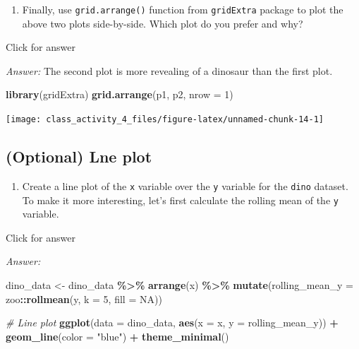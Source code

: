 \documentclass[
]{book}
\newenvironment{Shaded}{\begin{snugshade}}{\end{snugshade}}
\newcommand{\AttributeTok}[1]{\textcolor[rgb]{0.13,0.29,0.53}{#1}}
\newcommand{\CommentTok}[1]{\textcolor[rgb]{0.56,0.35,0.01}{\textit{#1}}}
\newcommand{\ConstantTok}[1]{\textcolor[rgb]{0.56,0.35,0.01}{#1}}
\newcommand{\DecValTok}[1]{\textcolor[rgb]{0.00,0.00,0.81}{#1}}
\newcommand{\FunctionTok}[1]{\textcolor[rgb]{0.13,0.29,0.53}{\textbf{#1}}}
\newcommand{\NormalTok}[1]{#1}
\newcommand{\OtherTok}[1]{\textcolor[rgb]{0.56,0.35,0.01}{#1}}
\newcommand{\SpecialCharTok}[1]{\textcolor[rgb]{0.81,0.36,0.00}{\textbf{#1}}}
\newcommand{\StringTok}[1]{\textcolor[rgb]{0.31,0.60,0.02}{#1}}
\providecommand{\tightlist}{%
  \setlength{\itemsep}{0pt}\setlength{\parskip}{0pt}}
\begin{document}
\begin{enumerate}
\def\labelenumi{\alph{enumi}.}
\setcounter{enumi}{2}
\tightlist
\item
  Finally, use \texttt{grid.arrange()} function from \texttt{gridExtra} package to plot the above two plots side-by-side. Which plot do you prefer and why?
\end{enumerate}

Click for answer

\emph{Answer:} The second plot is more revealing of a dinosaur than the first plot.

\begin{Shaded}
\begin{Highlighting}[]
\FunctionTok{library}\NormalTok{(gridExtra)}
\FunctionTok{grid.arrange}\NormalTok{(p1, p2, }\AttributeTok{nrow =} \DecValTok{1}\NormalTok{)}
\end{Highlighting}
\end{Shaded}

\texttt{[image: class\_activity\_4\_files/figure-latex/unnamed-chunk-14-1]}

\hypertarget{optional-lne-plot}{%
\subsection{(Optional) Lne plot}\label{optional-lne-plot}}

\begin{enumerate}
\def\labelenumi{\alph{enumi}.}
\tightlist
\item
  Create a line plot of the \texttt{x} variable over the \texttt{y} variable for the \texttt{dino} dataset. To make it more interesting, let's first calculate the rolling mean of the \texttt{y} variable.
\end{enumerate}

Click for answer

\emph{Answer:}

\begin{Shaded}
\begin{Highlighting}[]
\NormalTok{dino\_data }\OtherTok{\textless{}{-}}\NormalTok{ dino\_data }\SpecialCharTok{\%\textgreater{}\%}
  \FunctionTok{arrange}\NormalTok{(x) }\SpecialCharTok{\%\textgreater{}\%}
  \FunctionTok{mutate}\NormalTok{(}\AttributeTok{rolling\_mean\_y =}\NormalTok{ zoo}\SpecialCharTok{::}\FunctionTok{rollmean}\NormalTok{(y, }\AttributeTok{k =} \DecValTok{5}\NormalTok{, }\AttributeTok{fill =} \ConstantTok{NA}\NormalTok{))}

\CommentTok{\# Line plot}
\FunctionTok{ggplot}\NormalTok{(}\AttributeTok{data =}\NormalTok{ dino\_data, }\FunctionTok{aes}\NormalTok{(}\AttributeTok{x =}\NormalTok{ x, }\AttributeTok{y =}\NormalTok{ rolling\_mean\_y)) }\SpecialCharTok{+}
  \FunctionTok{geom\_line}\NormalTok{(}\AttributeTok{color =} \StringTok{"blue"}\NormalTok{) }\SpecialCharTok{+}
  \FunctionTok{theme\_minimal}\NormalTok{()}
\end{Highlighting}
\end{Shaded}
\end{document}
